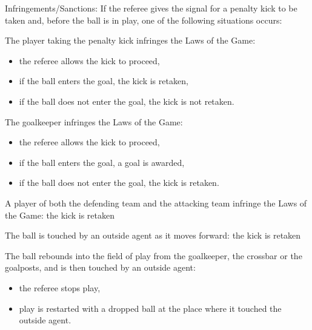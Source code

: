 \documentclass[12pt]{hurocup}
\begin{document}
\begin{lawlist}[US]
\item Infringements/Sanctions: \label{pk-infringements} If the referee
  gives the signal for a penalty kick to be taken and, before the ball
  is in play, one of the following situations occurs:

  The player taking the penalty kick infringes the Laws of the Game:
  \begin{itemize}
  \item the referee allows the kick to proceed,
  \item if the ball enters the goal, the kick is retaken,
  \item if the ball does not enter the goal, the kick is not retaken.
  \end{itemize}

  The goalkeeper infringes the Laws of the Game:
  \begin{itemize}
  \item the referee allows the kick to proceed,
  \item if the ball enters the goal, a goal is awarded,
  \item if the ball does not enter the goal, the kick is retaken.
  \end{itemize}

  A player of both the defending team and the attacking team
  infringe the Laws of the Game: the kick is retaken

  The ball is touched by an outside agent as it moves forward: the
  kick is retaken

  The ball rebounds into the field of play from the goalkeeper,
  the crossbar or the goalposts, and is then touched by an outside agent:
  \begin{itemize}
  \item the referee stops play,
  \item play is restarted with a dropped ball at the place where it
    touched the outside agent. 
  \end{itemize}
\end{lawlist}

\end{document}
